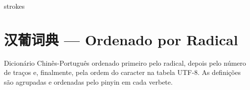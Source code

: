 \documentclass[a4paper,9pt,twoside,openright,book]{memoir}
\begin{document}
\clearpage
\begin{DictionaryEntries}{strokes}
 
 
 
 
 
 
 
 
 
 
 
 
 
 
 
 
 
 
 
 
 
 
% 
% 
% 
% 
% 
% 
% 
% 
% 
\end{DictionaryEntries}

\clearpage
\pagestyle{empty}
\chapter{汉葡词典 --- Ordenado por Radical}

%
%

Dicionário Chinês-Português ordenado primeiro pelo radical,
depois pelo número de traços e, finalmente, pela ordem do
caracter na tabela UTF-8.  As definições são agrupadas e
ordenadas pelo pinyin em cada verbete.
\end{document}

